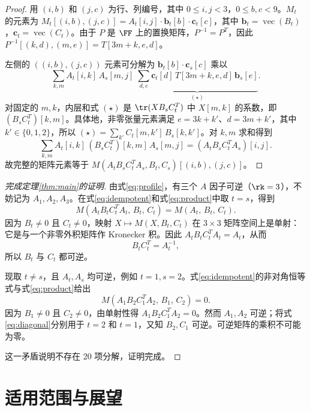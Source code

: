 \documentclass[11pt,a4paper]{article}
\begin{document}
\begin{proof}
  用 $(i,b)$ 和 $(j,c)$ 为行、列编号，其中 $0\le i,j<3$，$0\le b,c<9$。$M_t$ 的元素为 $M_t[(i,b),(j,c)]=A_t[i,j]\cdot\mathbf{b}_t[b]\cdot\mathbf{c}_t[c]$，其中 $\mathbf{b}_t=\operatorname{vec}(B_t)$，$\mathbf{c}_t=\operatorname{vec}(C_t)$。由于 $P$ 是 $\FF$ 上的置换矩阵，$P^{-1}=P^T$，因此 $P^{-1}[(k,d),(m,e)]=T[3m+k,e,d]$。

  左侧的 $((i,b),(j,c))$ 元素可分解为 $\mathbf{b}_t[b]\cdot\mathbf{c}_s[c]$ 乘以
  \[
    \sum_{k,m}A_t[i,k]\,A_s[m,j]\;\underbrace{\sum_{d,e}\mathbf{c}_t[d]\,T[3m+k,e,d]\,\mathbf{b}_s[e]}_{(\star)}.
  \]
  对固定的 $m,k$，内层和式 $(\star)$ 是 $\tr(XB_sC_t^T)$ 中 $X[m,k]$ 的系数，即 $(B_sC_t^T)[k,m]$。具体地，非零张量元素满足 $e=3k+k'$、$d=3m+k'$，其中 $k'\in\{0,1,2\}$，所以 $(\star)=\sum_{k'}C_t[m,k']\,B_s[k,k']$。对 $k,m$ 求和得到
  \[
    \sum_{k,m}A_t[i,k]\,(B_sC_t^T)[k,m]\,A_s[m,j]=(A_tB_sC_t^TA_s)[i,j].
  \]
  故完整的矩阵元素等于 $M(A_tB_sC_t^TA_s,B_t,C_s)[(i,b),(j,c)]$。
\end{proof}

\begin{proof}[完成定理\ref{thm:main}的证明]
  由式\eqref{eq:profile}，有三个 $A$ 因子可逆（$\rk=3$），不妨记为 $A_1,A_2,A_3$。在式\eqref{eq:idempotent}和式\eqref{eq:product}中取 $t=s$，得到
  \[
    M(A_tB_tC_t^TA_t,\,B_t,\,C_t)=M(A_t,\,B_t,\,C_t).
  \]
  因为 $B_t\ne0$ 且 $C_t\ne0$，映射 $X\mapsto M(X,B_t,C_t)$ 在 $3\times3$ 矩阵空间上是单射：它是与一个非零外积矩阵作 Kronecker 积。因此 $A_tB_tC_t^TA_t=A_t$，从而
  \begin{equation}\label{eq:diagonal}
    B_tC_t^T=A_t^{-1},
  \end{equation}
  所以 $B_t$ 与 $C_t$ 都可逆。

  现取 $t\ne s$，且 $A_t,A_s$ 均可逆，例如 $t=1,s=2$。式\eqref{eq:idempotent}的非对角恒等式与式\eqref{eq:product}给出
  \begin{equation}\label{eq:off-diagonal-zero}
    M(A_1B_2C_1^TA_2,\,B_1,\,C_2)=0.
  \end{equation}
  因为 $B_1\ne0$ 且 $C_2\ne0$，由单射性得 $A_1B_2C_1^TA_2=0$。然而 $A_1,A_2$ 可逆；将式\eqref{eq:diagonal}分别用于 $t=2$ 和 $t=1$，又知 $B_2,C_1$ 可逆。可逆矩阵的乘积不可能为零。

  这一矛盾说明不存在 20 项分解，证明完成。
\end{proof}

\section{适用范围与展望}\label{sec:outlook}
\end{document}
